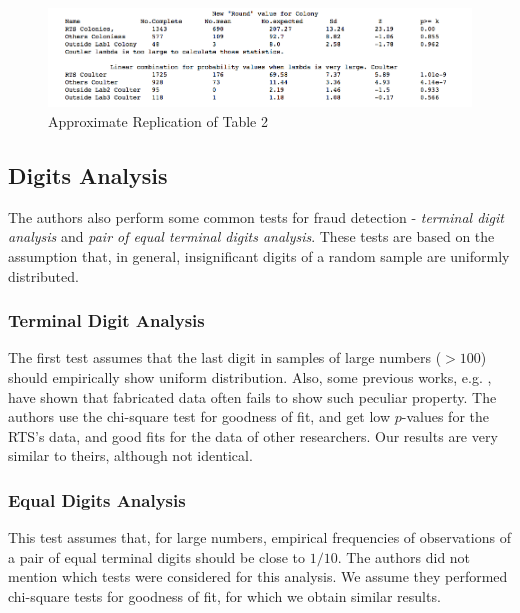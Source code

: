 \documentclass{article}
\begin{document}
\begin{figure}[H]
\centering
\includegraphics[width=0.9\linewidth]{images/HT_Stat_values.png}
\caption{Approximate Replication of Table 2}
\label{table2}
\end{figure}

    \subsection{Digits Analysis}\label{digits-analysis}

The authors also perform some common tests for fraud detection - \textit{terminal
digit analysis} and \textit{pair of equal terminal digits analysis}. These tests
are based on the assumption that, in general, insignificant digits of a random sample are uniformly distributed.

\subsubsection{Terminal Digit Analysis}\label{terminal-digit-analysis}

The first test assumes that the last digit in samples of large numbers
($>100$) should empirically show uniform distribution. 
Also, some previous works, e.g. \cite{mosimann2002terminal},
have shown that fabricated data often fails to show such peculiar property.
The authors use the chi-square test for goodness of fit, and get low $p$-values for the RTS's data, and good fits for
the data of other researchers.
Our results are very similar to theirs, although not identical.

\subsubsection{Equal Digits Analysis}\label{equal-digits-analysis}

This test assumes that, for large numbers, empirical frequencies of observations of a
pair of equal terminal digits should be close to $1/10$. 
The authors did not mention which tests were considered for this analysis.
We assume they performed chi-square tests for goodness of fit, for which we obtain similar results.
\end{document}
